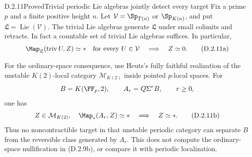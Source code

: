 \begin{claim}{D.2.11}{Proved}{Trivial periodic Lie algebras jointly detect every target}
Fix a prime $p$ and a finite positive height $n$. Let
$\mathcal V=\Sp_{T(n)}$ or $\Sp_{K(n)}$, and put
$\mathfrak L=\operatorname{Lie}(\mathcal V)$.
The trivial Lie algebras generate $\mathfrak L$ under small
colimits and retracts. In fact a countable set of trivial Lie
algebras suffices. In particular,
\[
 \Map_{\mathfrak L}(\operatorname{triv}U,Z)\simeq *
 \quad\hbox{for every }U\in\mathcal V
 \quad\Longrightarrow\quad Z\simeq0.
 \tag{D.2.11a}
\]

For the ordinary-space consequence, use Heuts's fully faithful
realization of the unstable $K(2)$-local category
$\mathcal M_{K(2)}$ inside pointed $p$-local spaces. For
\[
 B=K(\FF_p,2),\qquad A_r=Q\Sigma^rB,\qquad r\geq0,
\]
one has
\[
 Z\in\mathcal M_{K(2)},\quad
 \Map_*(A_r,Z)\simeq *
 \quad\Longrightarrow\quad Z\simeq *.
 \tag{D.2.11b}
\]
Thus no noncontractible target in that unstable periodic category
can separate $B$ from the reversible class generated by $A_r$.
This does not compute the ordinary-space nullification in
\textup{(D.2.9b)}, or compare it with periodic localization.
\end{claim}
